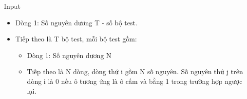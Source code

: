 Input
\begin{itemize}
	\item     Dòng 1: Số nguyên dương T - số bộ test.   
	\item     Tiếp theo là T bộ test, mỗi bộ test gồm:    
\begin{itemize}
	\item       Dòng 1: Số nguyên dương N     
	\item       Tiếp theo là N dòng, dòng thứ i gồm N số nguyên. Số nguyên thứ j trên dòng i là 0 nếu ô tương ứng là ô cấm và bằng 1 trong trường hợp ngược lại.     
\end{itemize}
\end{itemize}